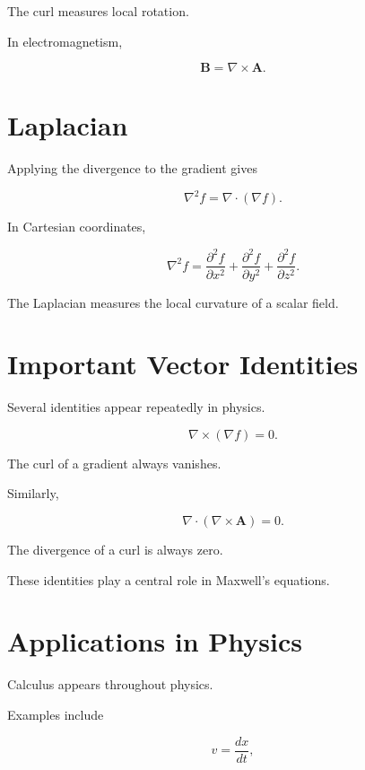 \documentclass[11pt,a4paper,openany]{book}
\begin{document}
The curl measures local rotation.

In electromagnetism,

\[
\boxed{
	\mathbf B
	=
	\nabla\times\mathbf A.
}
\]


\section{Laplacian}

Applying the divergence to the gradient gives

\[
\boxed{
	\nabla^2f
	=
	\nabla\cdot(\nabla f).
}
\]

In Cartesian coordinates,

\[
\boxed{
	\nabla^2f
	=
	\frac{\partial^2f}{\partial x^2}
	+
	\frac{\partial^2f}{\partial y^2}
	+
	\frac{\partial^2f}{\partial z^2}.
}
\]

The Laplacian measures the local curvature of a scalar field.


\section{Important Vector Identities}

Several identities appear repeatedly in physics.

\[
\boxed{
	\nabla\times(\nabla f)=0.
}
\]

The curl of a gradient always vanishes.

Similarly,

\[
\boxed{
	\nabla\cdot(\nabla\times\mathbf A)=0.
}
\]

The divergence of a curl is always zero.

These identities play a central role in Maxwell's equations.


\section{Applications in Physics}

Calculus appears throughout physics.

Examples include

\[
v=\frac{dx}{dt},
\]
\end{document}
